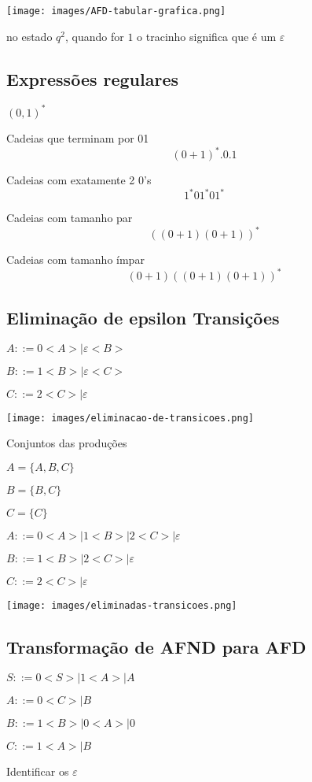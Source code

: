 \documentclass[]{article}
\begin{document}
		\texttt{[image: images/AFD-tabular-grafica.png]}
		
		no estado $q^2$, quando for $1$ o tracinho significa que é um $\varepsilon$
		\subsection{Expressões regulares}
		
		$(0,1)^*$
		
		Cadeias que terminam por 01
		$$(0+1)^*.0.1$$
		
		Cadeias com exatamente 2 $0$'s
		$$1^*01^*01^*$$
		
		Cadeias com tamanho par
		$$((0+1)(0+1))^*$$		
		
		
		Cadeias com tamanho ímpar
		$$(0+1)((0+1)(0+1))^*$$
		
		\subsection{Eliminação de epsilon Transições}
		
		$A::= 0<A> | \varepsilon <B>$
		
		$B::= 1<B> | \varepsilon<C>$
		
		$C::= 2<C> | \varepsilon$
		
		\texttt{[image: images/eliminacao-de-transicoes.png]}
		
		Conjuntos das produções
		
		$A=\{ A,B,C\}$
		
		$B=\{B,C\}$
		
		$C=\{C\}$
				
		$A ::= 0<A> | 1<B> | 2<C> | \varepsilon$
		
		$B::= 1<B> | 2<C> | \varepsilon$
		
		$C::= 2<C> | \varepsilon$
		
		\texttt{[image: images/eliminadas-transicoes.png]}
		
		\subsection{Transformação de AFND para AFD}
		
		$S::= 0<S> | 1<A> | A$
		
		$A::= 0<C> | B$
		
		$B::= 1<B> | 0<A> | 0$
		
		$C::= 1<A> | B$
		
		\begin{center}
		Identificar os $\varepsilon$
		\end{center}
		
\end{document}
